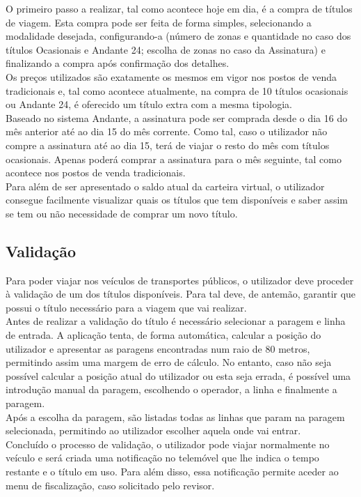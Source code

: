 O primeiro passo a realizar, tal como acontece hoje em dia, é a compra de títulos de viagem. Esta compra pode ser feita de forma simples, selecionando a modalidade desejada, configurando-a (número de zonas e quantidade no caso dos títulos Ocasionais e Andante 24; escolha de zonas no caso da Assinatura) e finalizando a compra após confirmação dos detalhes.
\\Os preços utilizados são exatamente os mesmos em vigor nos postos de venda tradicionais e, tal como acontece atualmente, na compra de 10 títulos ocasionais ou Andante 24, é oferecido um título extra com a mesma tipologia.
\\Baseado no sistema Andante, a assinatura pode ser comprada desde o dia 16 do mês anterior até ao dia 15 do mês corrente. Como tal, caso o utilizador não compre a assinatura até ao dia 15, terá de viajar o resto do mês com títulos ocasionais. Apenas poderá comprar a assinatura para o mês seguinte, tal como acontece nos postos de venda tradicionais.
\\Para além de ser apresentado o saldo atual da carteira virtual, o utilizador consegue facilmente visualizar quais os títulos que tem disponíveis e saber assim se tem ou não necessidade de comprar um novo título.

\subsection{Validação}

Para poder viajar nos veículos de transportes públicos, o utilizador deve proceder à validação de um dos títulos disponíveis. Para tal deve, de antemão, garantir que possui o título necessário para a viagem que vai realizar.
\\Antes de realizar a validação do título é necessário selecionar a paragem e linha de entrada. A aplicação tenta, de forma automática, calcular a posição do utilizador e apresentar as paragens encontradas num raio de 80 metros, permitindo assim uma margem de erro de cálculo. No entanto, caso não seja possível calcular a posição atual do utilizador ou esta seja errada, é possível uma introdução manual da paragem, escolhendo o operador, a linha e finalmente a paragem.
\\Após a escolha da paragem, são listadas todas as linhas que param na paragem selecionada, permitindo ao utilizador escolher aquela onde vai entrar.
\\Concluído o processo de validação, o utilizador pode viajar normalmente no veículo e será criada uma notificação no telemóvel que lhe indica o tempo restante e o título em uso. Para além disso, essa notificação permite aceder ao menu de fiscalização, caso solicitado pelo revisor.

